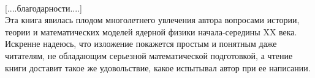 \\

[....благодарности....]
\\

Эта книга явилась плодом многолетнего увлечения автора вопросами истории, теории и математических моделей ядерной физики начала-середины XX века. 
Искренне надеюсь, что изложение покажется простым и понятным даже читателям, не обладающим серьезной математической подготовкой, а чтение книги доставит такое же удовольствие, какое испытывал автор при ее написании.

